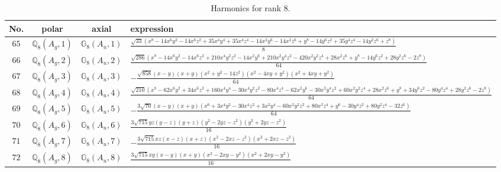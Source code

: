 \documentclass[fleqn,8pt,landscape]{jsarticle}
\begin{document}
\begin{table}[ht!]
\begin{center}
\caption{Harmonics for rank 8.}
\renewcommand{\arraystretch}{1.3}
\begin{tabular}{cccl} \hline \hline
No. & polar & axial & expression \\ \hline
$ 65 $ & $ \mathbb{Q}_{8}(A_{g},1) $ & $ \mathbb{G}_{8}(A_{u},1) $ & $ \frac{\sqrt{33} \left(x^{8} - 14 x^{6} y^{2} - 14 x^{6} z^{2} + 35 x^{4} y^{4} + 35 x^{4} z^{4} - 14 x^{2} y^{6} - 14 x^{2} z^{6} + y^{8} - 14 y^{6} z^{2} + 35 y^{4} z^{4} - 14 y^{2} z^{6} + z^{8}\right)}{8} $ \\
$ 66 $ & $ \mathbb{Q}_{8}(A_{g},2) $ & $ \mathbb{G}_{8}(A_{u},2) $ & $ \frac{\sqrt{286} \left(x^{8} - 14 x^{6} y^{2} - 14 x^{6} z^{2} + 210 x^{4} y^{2} z^{2} - 14 x^{2} y^{6} + 210 x^{2} y^{4} z^{2} - 420 x^{2} y^{2} z^{4} + 28 x^{2} z^{6} + y^{8} - 14 y^{6} z^{2} + 28 y^{2} z^{6} - 2 z^{8}\right)}{64} $ \\
$ 67 $ & $ \mathbb{Q}_{8}(A_{g},3) $ & $ \mathbb{G}_{8}(A_{u},3) $ & $ - \frac{\sqrt{858} \left(x - y\right) \left(x + y\right) \left(x^{2} + y^{2} - 14 z^{2}\right) \left(x^{2} - 4 x y + y^{2}\right) \left(x^{2} + 4 x y + y^{2}\right)}{64} $ \\
$ 68 $ & $ \mathbb{Q}_{8}(A_{g},4) $ & $ \mathbb{G}_{8}(A_{u},4) $ & $ \frac{\sqrt{210} \left(x^{8} - 62 x^{6} y^{2} + 34 x^{6} z^{2} + 160 x^{4} y^{4} - 30 x^{4} y^{2} z^{2} - 80 x^{4} z^{4} - 62 x^{2} y^{6} - 30 x^{2} y^{4} z^{2} + 60 x^{2} y^{2} z^{4} + 28 x^{2} z^{6} + y^{8} + 34 y^{6} z^{2} - 80 y^{4} z^{4} + 28 y^{2} z^{6} - 2 z^{8}\right)}{64} $ \\
$ 69 $ & $ \mathbb{Q}_{8}(A_{g},5) $ & $ \mathbb{G}_{8}(A_{u},5) $ & $ - \frac{3 \sqrt{70} \left(x - y\right) \left(x + y\right) \left(x^{6} + 3 x^{4} y^{2} - 30 x^{4} z^{2} + 3 x^{2} y^{4} - 60 x^{2} y^{2} z^{2} + 80 x^{2} z^{4} + y^{6} - 30 y^{4} z^{2} + 80 y^{2} z^{4} - 32 z^{6}\right)}{64} $ \\
$ 70 $ & $ \mathbb{Q}_{8}(A_{g},6) $ & $ \mathbb{G}_{8}(A_{u},6) $ & $ \frac{3 \sqrt{715} y z \left(y - z\right) \left(y + z\right) \left(y^{2} - 2 y z - z^{2}\right) \left(y^{2} + 2 y z - z^{2}\right)}{16} $ \\
$ 71 $ & $ \mathbb{Q}_{8}(A_{g},7) $ & $ \mathbb{G}_{8}(A_{u},7) $ & $ - \frac{3 \sqrt{715} x z \left(x - z\right) \left(x + z\right) \left(x^{2} - 2 x z - z^{2}\right) \left(x^{2} + 2 x z - z^{2}\right)}{16} $ \\
$ 72 $ & $ \mathbb{Q}_{8}(A_{g},8) $ & $ \mathbb{G}_{8}(A_{u},8) $ & $ \frac{3 \sqrt{715} x y \left(x - y\right) \left(x + y\right) \left(x^{2} - 2 x y - y^{2}\right) \left(x^{2} + 2 x y - y^{2}\right)}{16} $ \\

\end{tabular}
\end{center}
\end{table}
\end{document}
